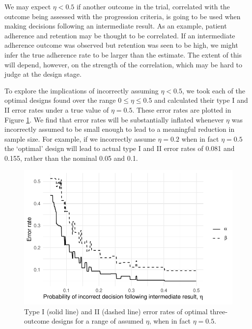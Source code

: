 \documentclass{bmcart}
\begin{document}
We may expect $\eta < 0.5$ if another outcome in the trial, correlated with the outcome being assessed with the progression criteria, is going to be used when making decisions following an intermediate result. As an example, patient adherence and retention may be thought to be correlated. If an intermediate adherence outcome was observed but retention was seen to be high, we might infer the true adherence rate to be larger than the estimate. The extent of this will depend, however, on the strength of the correlation, which may be hard to judge at the design stage. 

To explore the implications of incorrectly assuming $\eta < 0.5$, we took each of the optimal designs found over the range $0 \leq \eta \leq 0.5$ and calculated their type I and II error rates under a true value of $\eta = 0.5$. These error rates are plotted in Figure \ref{fig:eta_true_ocs}. We find that error rates will be substantially inflated whenever $\eta$ was incorrectly assumed to be small enough to lead to a meaningful reduction in sample size. For example, if we incorrectly assume $\eta = 0.2$ when in fact $\eta = 0.5$ the `optimal' design will lead to actual type I and II error rates of 0.081 and 0.155, rather than the nominal 0.05 and 0.1.

\begin{figure}
\centering
\includegraphics[scale=0.8]{./figures/eta_true_ocs}
\caption{Type I (solid line) and II (dashed line) error rates of optimal three-outcome designs for a range of assumed $\eta$, when in fact $\eta = 0.5$.}
\label{fig:eta_true_ocs}
\end{figure}

\end{document}
